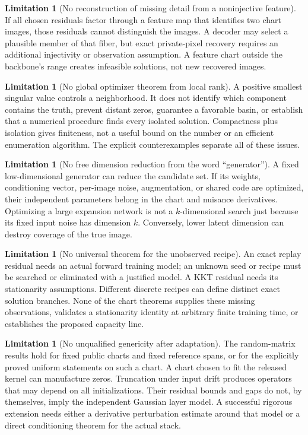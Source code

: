 \documentclass[11pt,a4paper]{article}
\theoremstyle{definition}
\theoremstyle{definition}
\newtheorem{limitation}[theorem]{Limitation}
\theoremstyle{remark}\newtheorem{remark}[theorem]{Remark}
\begin{document}
\begin{limitation}[No reconstruction of missing detail from a noninjective feature]
If all chosen residuals factor through a feature map that identifies two chart images, those residuals cannot distinguish the images. A decoder may select a plausible member of that fiber, but exact private-pixel recovery requires an additional injectivity or observation assumption. A feature chart outside the backbone's range creates infeasible solutions, not new recovered images.
\end{limitation}

\begin{limitation}[No global optimizer theorem from local rank]
A positive smallest singular value controls a neighborhood. It does not identify which component contains the truth, prevent distant zeros, guarantee a favorable basin, or establish that a numerical procedure finds every isolated solution. Compactness plus isolation gives finiteness, not a useful bound on the number or an efficient enumeration algorithm. The explicit counterexamples separate all of these issues.
\end{limitation}

\begin{limitation}[No free dimension reduction from the word ``generator'']
A fixed low-dimensional generator can reduce the candidate set. If its weights, conditioning vector, per-image noise, augmentation, or shared code are optimized, their independent parameters belong in the chart and nuisance derivatives. Optimizing a large expansion network is not a $k$-dimensional search just because its fixed input noise has dimension $k$. Conversely, lower latent dimension can destroy coverage of the true image.
\end{limitation}

\begin{limitation}[No universal theorem for the unobserved recipe]
An exact replay residual needs an actual forward training model; an unknown seed or recipe must be searched or eliminated with a justified model. A KKT residual needs its stationarity assumptions. Different discrete recipes can define distinct exact solution branches. None of the chart theorems supplies these missing observations, validates a stationarity identity at arbitrary finite training time, or establishes the proposed capacity line.
\end{limitation}

\begin{limitation}[No unqualified genericity after adaptation]
The random-matrix results hold for fixed public charts and fixed reference spans, or for the explicitly proved uniform statements on such a chart. A chart chosen to fit the released kernel can manufacture zeros. Truncation under input drift produces operators that may depend on all initializations. Their residual bounds and gaps do not, by themselves, imply the independent Gaussian layer model. A successful rigorous extension needs either a derivative perturbation estimate around that model or a direct conditioning theorem for the actual stack.
\end{limitation}
\end{document}
